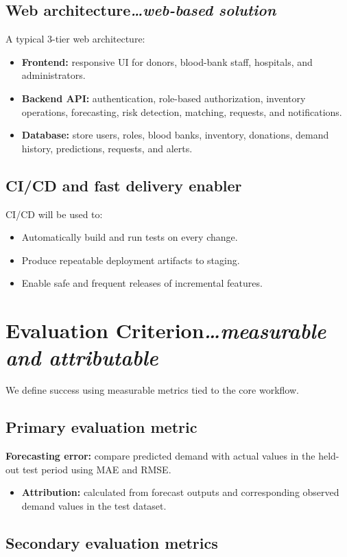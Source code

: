 \documentclass[11pt]{article}
\newcommand{\secnote}[2]{\section{#1\hfill\normalfont\normalsize\itshape #2}}
\newcommand{\subsecnote}[2]{\subsection{#1\hfill\normalfont\normalsize\itshape #2}}
\begin{document}
\subsecnote{Web architecture}{\ldots web-based solution}

A typical 3-tier web architecture:

\begin{itemize}
\item \textbf{Frontend:} responsive UI for donors, blood-bank staff, hospitals, and administrators.
\item \textbf{Backend API:} authentication, role-based authorization, inventory operations, forecasting,
risk detection, matching, requests, and notifications.
\item \textbf{Database:} store users, roles, blood banks, inventory, donations, demand history, predictions, requests, and alerts.
\end{itemize}

\subsection{CI/CD and fast delivery enabler}

CI/CD will be used to:

\begin{itemize}
\item Automatically build and run tests on every change.
\item Produce repeatable deployment artifacts to staging.
\item Enable safe and frequent releases of incremental features.
\end{itemize}

\secnote{Evaluation Criterion}{\ldots measurable and attributable}

We define success using measurable metrics tied to the core workflow.

\subsection{Primary evaluation metric}

\textbf{Forecasting error:} compare predicted demand with actual values in the held-out test period
using MAE and RMSE.

\begin{itemize}
\item \textbf{Attribution:} calculated from forecast outputs and corresponding observed demand values
in the test dataset.
\end{itemize}

\subsection{Secondary evaluation metrics}
\end{document}
